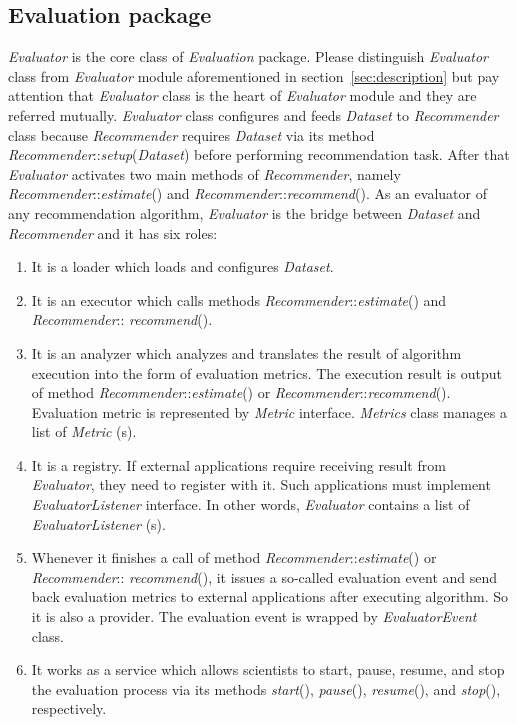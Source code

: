\documentclass[a4paper]{llncs}
\begin{document}
\subsection{Evaluation package}
\label{subsec:evaluation-package}
\textit{Evaluator} is the core class of \textit{Evaluation} package. Please distinguish \textit{Evaluator} class from \textit{Evaluator} module aforementioned in section~\ref{sec:description} but pay attention that \textit{Evaluator} class is the heart of \textit{Evaluator} module and they are referred mutually. \textit{Evaluator} class configures and feeds \textit{Dataset} to \textit{Recommender} class because \textit{Recommender} requires \textit{Dataset} via its method \textit{Recommender}::\textit{setup}(\textit{Dataset}) before performing recommendation task. After that \textit{Evaluator} activates two main methods of \textit{Recommender}, namely \textit{Recommender}::\textit{estimate}() and \textit{Recommender}::\textit{recommend}(). As an evaluator of any recommendation algorithm, \textit{Evaluator} is the bridge between \textit{Dataset} and \textit{Recommender} and it has six roles:
\begin{enumerate}
\item It is a loader which loads and configures \textit{Dataset}.
\item It is an executor which calls methods \textit{Recommender}::\textit{estimate}() and \textit{Recommender}:: \textit{recommend}().
\item It is an analyzer which analyzes and translates the result of algorithm execution into the form of evaluation metrics. The execution result is output of method \textit{Recommender}::\textit{estimate}() or \textit{Recommender}::\textit{recommend}(). Evaluation metric is represented by \textit{Metric} interface. \textit{Metrics} class manages a list of \textit{Metric} (s).
\item It is a registry. If external applications require receiving result from \textit{Evaluator}, they need to register with it. Such applications must implement \textit{EvaluatorListener} interface. In other words, \textit{Evaluator} contains a list of \textit{EvaluatorListener} (s).
\item Whenever it finishes a call of method \textit{Recommender}::\textit{estimate}() or \textit{Recommender}:: \textit{recommend}(), it issues a so-called evaluation event and send back evaluation metrics to external applications after executing algorithm. So it is also a provider. The evaluation event is wrapped by \textit{EvaluatorEvent} class.
\item It works as a service which allows scientists to start, pause, resume, and stop the evaluation process via its methods \textit{start}(), \textit{pause}(), \textit{resume}(), and \textit{stop}(), respectively.
\end{enumerate}
\end{document}
